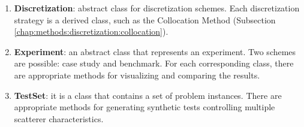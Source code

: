 \begin{enumerate}
				\item\textbf{Discretization}: abstract class for discretization schemes. Each discretization strategy is a derived class, such as the Collocation Method (Subsection \ref{chap:methods:discretization:collocation}).
				\item\textbf{Experiment}: an abstract class that represents an experiment. Two schemes are possible: case study and benchmark. For each corresponding class, there are appropriate methods for visualizing and comparing the results.
				\item\textbf{TestSet}: it is a class that contains a set of problem instances. There are appropriate methods for generating synthetic tests controlling multiple scatterer characteristics.
			\end{enumerate}

